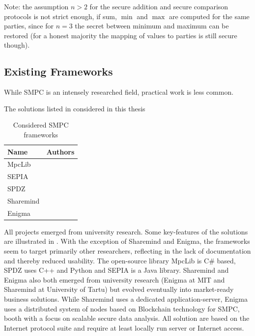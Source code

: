 Note: the assumption $n>2$ for the secure addition and secure comparison protocols is not strict enough, if sum, $\min$ and $\max$ are computed for the same parties, since for $n=3$ the secret between minimum and maximum can be restored (for a honest majority the mapping of values to parties is still secure though).

\subsection{Existing Frameworks} \label{Existing Frameworks}

While \gls{SMPC} is an intensely researched field, practical work is less common.

The solutions listed in  considered in this thesis

\begin{table}[]
	\centering
	\caption{Considered SMPC frameworks}
	\label{table:Considered SMPC frameworks}
	\begin{tabular}{|l|l|}
		\hline
		Name      & Authors                       \\ \hline
		MpcLib    & \textcite{Online:MpcLib}    \\ \hline
		SEPIA     & \textcite{Online:Sepia}     \\ \hline
		SPDZ      & \textcite{Online:SPDZ}      \\ \hline
		Sharemind & \textcite{Online:Sharemind} \\ \hline
		Enigma    & \textcite{Online:Enigma}    \\ \hline
	\end{tabular}
\end{table}

All projects emerged from university research. Some key-features of the solutions are illustrated in . With the exception of Sharemind and Enigma, the frameworks seem to target primarily other researchers, reflecting in the lack of documentation and thereby reduced usability. The open-source library MpcLib is C\# based, SPDZ uses C++ and Python and SEPIA is a Java library.  Sharemind and Enigma also both emerged from university research (Enigma at MIT and Sharemind at University of Tartu) but evolved eventually into market-ready business solutions. While Sharemind uses a dedicated application-server, Enigma uses a distributed system of nodes based on Blockchain technology for \gls{SMPC}, booth with a focus on scalable secure data analysis.
All solution are based on the Internet protocol suite and require at least locally run server or Internet access.

